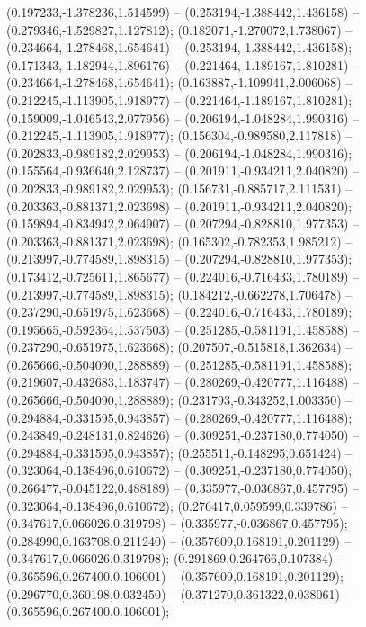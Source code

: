  (0.197233,-1.378236,1.514599) -- (0.253194,-1.388442,1.436158) -- (0.279346,-1.529827,1.127812);
 (0.182071,-1.270072,1.738067) -- (0.234664,-1.278468,1.654641) -- (0.253194,-1.388442,1.436158);
 (0.171343,-1.182944,1.896176) -- (0.221464,-1.189167,1.810281) -- (0.234664,-1.278468,1.654641);
 (0.163887,-1.109941,2.006068) -- (0.212245,-1.113905,1.918977) -- (0.221464,-1.189167,1.810281);
 (0.159009,-1.046543,2.077956) -- (0.206194,-1.048284,1.990316) -- (0.212245,-1.113905,1.918977);
 (0.156304,-0.989580,2.117818) -- (0.202833,-0.989182,2.029953) -- (0.206194,-1.048284,1.990316);
 (0.155564,-0.936640,2.128737) -- (0.201911,-0.934211,2.040820) -- (0.202833,-0.989182,2.029953);
 (0.156731,-0.885717,2.111531) -- (0.203363,-0.881371,2.023698) -- (0.201911,-0.934211,2.040820);
 (0.159894,-0.834942,2.064907) -- (0.207294,-0.828810,1.977353) -- (0.203363,-0.881371,2.023698);
 (0.165302,-0.782353,1.985212) -- (0.213997,-0.774589,1.898315) -- (0.207294,-0.828810,1.977353);
 (0.173412,-0.725611,1.865677) -- (0.224016,-0.716433,1.780189) -- (0.213997,-0.774589,1.898315);
 (0.184212,-0.662278,1.706478) -- (0.237290,-0.651975,1.623668) -- (0.224016,-0.716433,1.780189);
 (0.195665,-0.592364,1.537503) -- (0.251285,-0.581191,1.458588) -- (0.237290,-0.651975,1.623668);
 (0.207507,-0.515818,1.362634) -- (0.265666,-0.504090,1.288889) -- (0.251285,-0.581191,1.458588);
 (0.219607,-0.432683,1.183747) -- (0.280269,-0.420777,1.116488) -- (0.265666,-0.504090,1.288889);
 (0.231793,-0.343252,1.003350) -- (0.294884,-0.331595,0.943857) -- (0.280269,-0.420777,1.116488);
 (0.243849,-0.248131,0.824626) -- (0.309251,-0.237180,0.774050) -- (0.294884,-0.331595,0.943857);
 (0.255511,-0.148295,0.651424) -- (0.323064,-0.138496,0.610672) -- (0.309251,-0.237180,0.774050);
 (0.266477,-0.045122,0.488189) -- (0.335977,-0.036867,0.457795) -- (0.323064,-0.138496,0.610672);
 (0.276417,0.059599,0.339786) -- (0.347617,0.066026,0.319798) -- (0.335977,-0.036867,0.457795);
 (0.284990,0.163708,0.211240) -- (0.357609,0.168191,0.201129) -- (0.347617,0.066026,0.319798);
 (0.291869,0.264766,0.107384) -- (0.365596,0.267400,0.106001) -- (0.357609,0.168191,0.201129);
 (0.296770,0.360198,0.032450) -- (0.371270,0.361322,0.038061) -- (0.365596,0.267400,0.106001);
